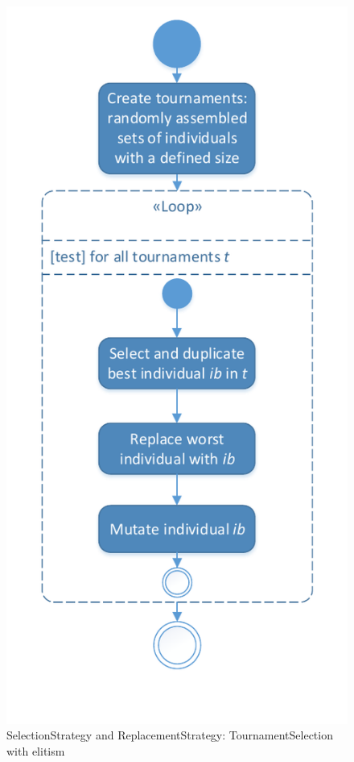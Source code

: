 \begin{figure}[!ht]
	\includegraphics[scale=0.7, trim=0cm 1cm 0cm 0cm, clip=true]{Images/SelectionAndReplacement_Tournament.pdf} 
	\caption{\Gls{SelectionStrategy} and \gls{ReplacementStrategy}: \Gls{TournamentSelection} with elitism}
	\label{figSelectionAndReplacement_Tournament}
\end{figure}

